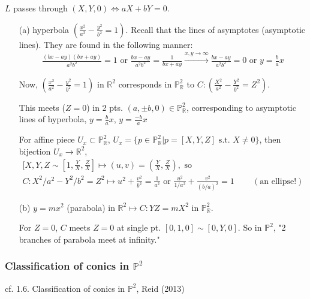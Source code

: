 \documentclass[10pt]{amsart}
\begin{document}
\begin{multicols*}{2}
$L$ passes through $(X,Y,0) \Longleftrightarrow a X + bY = 0$. 



\begin{enumerate}
	\item[(a)]  hyperbola $\left( \frac{x^2}{a^2} - \frac{y^2}{b^2} = 1 \right)$. Recall that the lines of asymptotes (asymptotic lines). They are found in the following manner: 
	\[
	\begin{gathered}
	\frac{(bx-ay)(bx + ay)}{a^2 b^2} = 1 \text{ or } \frac{bx-ay}{a^2 b^2} =  \frac{1}{ bx + ay} \xrightarrow{ x,y \to \infty} \frac{bx- ay}{a^2 b^2 } =0 \text{ or } y = \frac{b}{a} x
	\end{gathered}\]
	
	Now, $\left( \frac{x^2}{a^2} - \frac{y^2}{b^2} = 1 \right)$ in $\mathbb{R}^2$ 
	corresponds in $\mathbb{P}^2_{\mathbb{R}}$ to $C: \left( \frac{X^2}{a^2} - \frac{Y^2}{b^2} = Z^2 \right)$.
	
	This meets ($Z=0$) in 2 pts. $(a, \pm b, 0) \in \mathbb{P}^2_{\mathbb{R}}$, corresponding to asymptotic lines of hyperbola, $y = \frac{b}{a}x$, $y = \frac{-b}{a} x$
	
	For affine piece $U_x \subset \mathbb{P}^2_{\mathbb{R}}$, $U_x = \lbrace p \in \mathbb{P}^2_{\mathbb{R}} | p = [X,Y,Z] \text{ s.t. } X \neq 0 \rbrace$, then \\
	bijection $U_x \to \mathbb{R}^2$, 
	\[
	\begin{gathered}
	[X,Y,Z \sim [1, \frac{Y}{X}, \frac{Z}{X} ] \mapsto (u,v) = \left( \frac{Y}{X}, \frac{Z}{X} \right), \text{ so } \\
	C : X^2/a^2  - Y^2/b^2 = Z^2 \mapsto u^2 + \frac{v^2}{b^2} = \frac{1}{a^2} \text{ or } \frac{u^2}{1/a^2} + \frac{v^2}{ (b/a)^2 } = 1 \qquad \, (\text{an ellipse!})
	\end{gathered}
	\]
	\item[(b)] $y = mx^2$ (parabola) in $\mathbb{R}^2 \mapsto  C: YZ = mX^2$ in $\mathbb{P}^2_{\mathbb{R}}$.
	
	For $Z = 0$, $C$ meets $Z=0$ at single pt. $[0, 1, 0] \sim [0, Y, 0]$. So in $\mathbb{P}^2$, "2 branches of parabola meet at infinity."
\end{enumerate} 

\subsubsection{Classification of conics in $\mathbb{P}^2$}

cf. 1.6. Classification of conics in $\mathbb{P}^2$, Reid (2013) \cite{Reid2013}


\end{multicols*}
\end{document}
